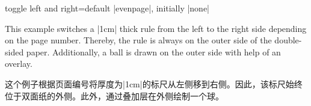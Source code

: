 \begin{docTcbKey}[][doc updated=2017-02-16]{toggle left and right}{=}{default |evenpage|, initially |none|}



This example switches a |1cm| thick rule from the left to the right side
depending on the page number. Thereby, the rule is always on the outer side
of the double-sided paper. Additionally, a ball is drawn on the outer side
with help of an overlay.

这个例子根据页面编号将厚度为|1cm|的标尺从左侧移到右侧。因此，该标尺始终位于双面纸的外侧。此外，通过叠加层在外侧绘制一个球。

\bigskip

\tcbusetemp
\end{docTcbKey}

